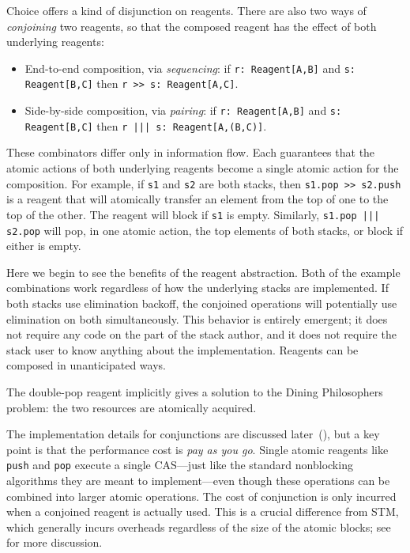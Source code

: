 \documentclass[preprint,nocopyrightspace]{sigplanconf}
\begin{document}
Choice offers a kind of disjunction on reagents.  There are also two
ways of \emph{conjoining} two reagents, so that the composed reagent
has the effect of both underlying reagents:
\begin{itemize} %
\item End-to-end composition, via \emph{sequencing}: if 
  \lstinline{r: Reagent[A,B]} and \lstinline{s: Reagent[B,C]} then 
  \lstinline{r >> s: Reagent[A,C]}.
\item Side-by-side composition, via \emph{pairing}: if 
  \lstinline{r: Reagent[A,B]} and \lstinline{s: Reagent[B,C]} then 
  \lstinline{r ||| s: Reagent[A,(B,C)]}.  
\end{itemize}
These combinators differ only in information flow.  Each guarantees
that the atomic actions of both underlying reagents become a single
atomic action for the composition.  For example, if \lstinline{s1} and
\lstinline{s2} are both stacks, then \lstinline{s1.pop >> s2.push} is
a reagent that will atomically transfer an element from the top of one
to the top of the other.  The reagent will block if \lstinline{s1} is
empty.  Similarly, \lstinline{s1.pop ||| s2.pop} will pop, in one
atomic action, the top elements of both stacks, or block if either is
empty.

Here we begin to see the benefits of the reagent abstraction.  Both of
the example combinations work regardless of how the underlying stacks
are implemented.  If both stacks use elimination backoff, the
conjoined operations will potentially use elimination on both
simultaneously.  This behavior is entirely emergent; it does not
require any code on the part of the stack author, and it does not
require the stack user to know anything about the implementation.
Reagents can be composed in unanticipated ways.


The double-pop reagent implicitly gives a solution to the Dining Philosophers
problem: the two resources are atomically acquired.

The implementation details for conjunctions are discussed
later~(), but a key point is that the performance cost
is \emph{pay as you go}.  Single atomic reagents like \lstinline{push} and
\lstinline{pop} execute a single CAS---just like the standard nonblocking
algorithms they are meant to implement---even though these operations can be
combined into larger atomic operations.  The cost of conjunction is only
incurred when a conjoined reagent is actually used.  This is a crucial
difference from STM, which generally incurs overheads regardless of the size
of the atomic blocks; see~ for more discussion.
\end{document}
